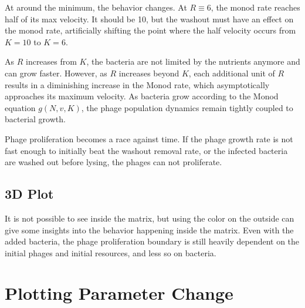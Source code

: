 At around the minimum, the behavior changes. 
At $R\equiv 6$, the monod rate reaches half of its max velocity. 
It should be 10, but the washout must have an effect on the monod rate, artificially shifting the point where the half velocity occurs from $K=10$ to $K=6$. 

As $R$ increases from $K$, the bacteria are not limited by the nutrients anymore and can grow faster. 
However, as $R$ increases beyond $K$, each additional unit of $R$ results in a diminishing increase in the Monod rate, which asymptotically approaches its maximum velocity. 
As bacteria grow according to the Monod equation $g(N, v, K)$, the phage population dynamics remain tightly coupled to bacterial growth. 

Phage proliferation becomes a race against time. 
If the phage growth rate is not fast enough to initially beat the washout removal rate, or the infected bacteria are washed out before lysing, the phages can not proliferate. 

\subsection{3D Plot}
It is not possible to see inside the matrix, but using the color on the outside can give some insights into the behavior happening inside the matrix. 
Even with the added bacteria, the phage proliferation boundary is still heavily dependent on the initial phages and initial resources, and less so on bacteria. 


\section{Plotting Parameter Change}
